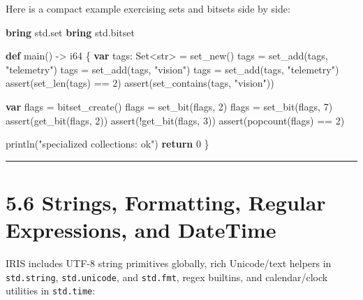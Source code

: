 \documentclass[
  english,
  oneside]{book}
\newenvironment{Shaded}{\begin{snugshade}}{\end{snugshade}}
\newcommand{\ControlFlowTok}[1]{\textcolor[rgb]{0.77,0.53,0.75}{\textbf{#1}}}
\newcommand{\DataTypeTok}[1]{\textcolor[rgb]{0.31,0.79,0.69}{#1}}
\newcommand{\DecValTok}[1]{\textcolor[rgb]{0.71,0.81,0.66}{#1}}
\newcommand{\FunctionTok}[1]{\textcolor[rgb]{0.86,0.86,0.67}{#1}}
\newcommand{\KeywordTok}[1]{\textcolor[rgb]{0.34,0.61,0.84}{\textbf{#1}}}
\newcommand{\NormalTok}[1]{\textcolor[rgb]{0.83,0.83,0.83}{#1}}
\newcommand{\OperatorTok}[1]{\textcolor[rgb]{0.83,0.83,0.83}{#1}}
\newcommand{\StringTok}[1]{\textcolor[rgb]{0.81,0.57,0.47}{#1}}
\begin{document}
Here is a compact example exercising sets and bitsets side by side:

\begin{Shaded}
\begin{Highlighting}[]
\KeywordTok{bring}\NormalTok{ std}\OperatorTok{.}\NormalTok{set}
\KeywordTok{bring}\NormalTok{ std}\OperatorTok{.}\DataTypeTok{bitset}

\KeywordTok{def}\NormalTok{ main() }\OperatorTok{{-}\textgreater{}} \DataTypeTok{i64}\NormalTok{ \{}
    \KeywordTok{var}\NormalTok{ tags: Set}\OperatorTok{\textless{}}\DataTypeTok{str}\OperatorTok{\textgreater{}} \OperatorTok{=}\NormalTok{ set\_new()}
\NormalTok{    tags }\OperatorTok{=}\NormalTok{ set\_add(tags, }\StringTok{"telemetry"}\NormalTok{)}
\NormalTok{    tags }\OperatorTok{=}\NormalTok{ set\_add(tags, }\StringTok{"vision"}\NormalTok{)}
\NormalTok{    tags }\OperatorTok{=}\NormalTok{ set\_add(tags, }\StringTok{"telemetry"}\NormalTok{)}
    \FunctionTok{assert}\NormalTok{(set\_len(tags) }\OperatorTok{==} \DecValTok{2}\NormalTok{)}
    \FunctionTok{assert}\NormalTok{(set\_contains(tags, }\StringTok{"vision"}\NormalTok{))}

    \KeywordTok{var}\NormalTok{ flags }\OperatorTok{=}\NormalTok{ bitset\_create()}
\NormalTok{    flags }\OperatorTok{=}\NormalTok{ set\_bit(flags, }\DecValTok{2}\NormalTok{)}
\NormalTok{    flags }\OperatorTok{=}\NormalTok{ set\_bit(flags, }\DecValTok{7}\NormalTok{)}
    \FunctionTok{assert}\NormalTok{(get\_bit(flags, }\DecValTok{2}\NormalTok{))}
    \FunctionTok{assert}\NormalTok{(}\OperatorTok{!}\NormalTok{get\_bit(flags, }\DecValTok{3}\NormalTok{))}
    \FunctionTok{assert}\NormalTok{(popcount(flags) }\OperatorTok{==} \DecValTok{2}\NormalTok{)}

\NormalTok{    println(}\StringTok{"specialized collections: ok"}\NormalTok{)}
    \ControlFlowTok{return} \DecValTok{0}
\NormalTok{\}}
\end{Highlighting}
\end{Shaded}

\begin{center}\rule{0.5\linewidth}{0.5pt}\end{center}

\section{5.6 Strings, Formatting, Regular Expressions, and
DateTime}\label{strings-formatting-regular-expressions-and-datetime}

IRIS includes UTF-8 string primitives globally, rich Unicode/text
helpers in \texttt{std.string}, \texttt{std.unicode}, and
\texttt{std.fmt}, regex builtins, and calendar/clock utilities in
\texttt{std.time}:
\end{document}

